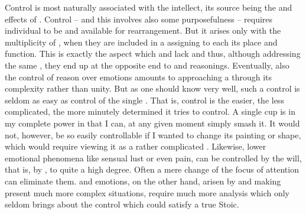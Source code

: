 Control is most naturally associated with the intellect, its source being the
 and  effects of . 
Control -- and this involves also some purposefulness -- requires individual
 to be  and available for rearrangement. But it
arises only with the multiplicity of , when they are included in a
 assigning to each its place and function. This  is
exactly the aspect which  and  lack and thus, although
addressing the same , they end up at the opposite end to
 and reasonings.  Eventually, also the control of reason over
emotions amounts to approaching a  through its complexity rather
than unity. But as one should know very well, such a control is seldom as easy
as control of the single . That is, control is the easier, the less
complicated, the more minutely determined  it tries to control. A
single cup is in my complete power in that I can, at any given moment simply
smash it. It would not, however, be so easily controllable if I wanted to change
its painting or shape, which would require viewing it as a rather complicated
.  Likewise, lower emotional phenomena like sensual lust or even
pain, can be controlled by the will, that is, by , to quite a high
degree. Often a mere change of the focus of attention can eliminate them.
 and emotions, on the other hand, arisen by and making present much
more complex situations, require much more analysis which only seldom brings
about the control which could satisfy a true Stoic. 



